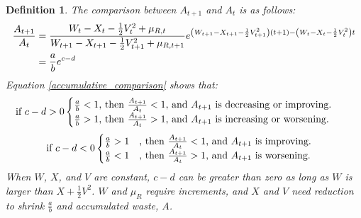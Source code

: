 \documentclass[sn-basic]{sn-jnl}%
\theoremstyle{thmstyleone}%
\theoremstyle{thmstyletwo}%
\theoremstyle{thmstylethree}%
\newtheorem{definition}{Definition}%
\begin{document}
\begin{definition}
The comparison between $A_{t+1}$ and $A_t$ is as follows:\\
\footnotesize
\begin{align}\label{accumulative_comparison}
    \frac{A_{t+1}}{A_t}&=\frac{W_{t}-X_{t}-\frac{1}{2} V_{t}^2+\mu_{R,t}}{W_{t+1}-X_{t+1}-\frac{1}{2} V_{t+1}^2+\mu_{R,t+1}}e^{\left(W_{t+1}-X_{t+1}-\frac{1}{2} V_{t+1}^2\right)\left(t+1\right)-\left(W_{t}-X_{t}-\frac{1}{2} V_{t}^2\right)t}\notag\\
    &=\frac{a}{b}e^{c-d}
\end{align}
\normalsize
Equation \ref{accumulative_comparison} shows that:
\begin{align}
\mbox{if } c-d>0 &
    \begin{cases}
        \frac{a}{b}<1 \mbox{, then } \frac{A_{t+1}}{A_t}<1 \mbox{, and $A_{t+1}$ is decreasing or improving.}\notag\\
        \frac{a}{b}>1 \mbox{, then } \frac{A_{t+1}}{A_t}>1 \mbox{, and $A_{t+1}$ is increasing or worsening.}\notag\\
    \end{cases}
\end{align}
\begin{align}
\mbox{if } c-d<0 &
    \begin{cases}
        \frac{a}{b}>1 &\mbox{, then } \frac{A_{t+1}}{A_t}<1 \mbox{, and $A_{t+1}$ is improving.}\notag\\
        \frac{a}{b}<1 &\mbox{, then } \frac{A_{t+1}}{A_t}>1 \mbox{, and $A_{t+1}$ is worsening.}
    \end{cases}
\end{align}
When $W$, $X$, and $V$ are constant, $c-d$ can be greater than zero as long as $W$ is larger than $X+\frac{1}{2}V^2$. $W$ and $\mu_R$ require increments, and $X$ and $V$ need reduction to shrink $\frac{a}{b}$ and accumulated waste, $A$.
\end{definition}
\end{document}

